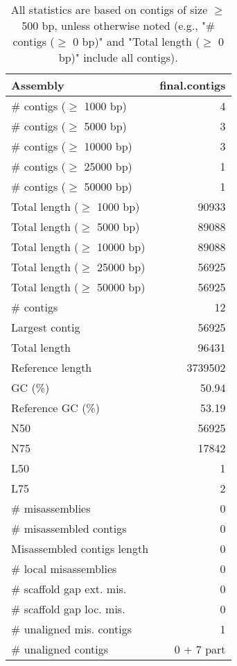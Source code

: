 \documentclass[12pt,a4paper]{article}
\begin{document}
\begin{table}[ht]
\begin{center}
\caption{All statistics are based on contigs of size $\geq$ 500 bp, unless otherwise noted (e.g., "\# contigs ($\geq$ 0 bp)" and "Total length ($\geq$ 0 bp)" include all contigs).}
\begin{tabular}{|l*{1}{|r}|}
\hline
Assembly & final.contigs \\ \hline
\# contigs ($\geq$ 1000 bp) & 4 \\ \hline
\# contigs ($\geq$ 5000 bp) & 3 \\ \hline
\# contigs ($\geq$ 10000 bp) & 3 \\ \hline
\# contigs ($\geq$ 25000 bp) & 1 \\ \hline
\# contigs ($\geq$ 50000 bp) & 1 \\ \hline
Total length ($\geq$ 1000 bp) & 90933 \\ \hline
Total length ($\geq$ 5000 bp) & 89088 \\ \hline
Total length ($\geq$ 10000 bp) & 89088 \\ \hline
Total length ($\geq$ 25000 bp) & 56925 \\ \hline
Total length ($\geq$ 50000 bp) & 56925 \\ \hline
\# contigs & 12 \\ \hline
Largest contig & 56925 \\ \hline
Total length & 96431 \\ \hline
Reference length & 3739502 \\ \hline
GC (\%) & 50.94 \\ \hline
Reference GC (\%) & 53.19 \\ \hline
N50 & 56925 \\ \hline
N75 & 17842 \\ \hline
L50 & 1 \\ \hline
L75 & 2 \\ \hline
\# misassemblies & 0 \\ \hline
\# misassembled contigs & 0 \\ \hline
Misassembled contigs length & 0 \\ \hline
\# local misassemblies & 0 \\ \hline
\# scaffold gap ext. mis. & 0 \\ \hline
\# scaffold gap loc. mis. & 0 \\ \hline
\# unaligned mis. contigs & 1 \\ \hline
\# unaligned contigs & 0 + 7 part \\ \hline

\end{tabular}
\end{center}
\end{table}
\end{document}

